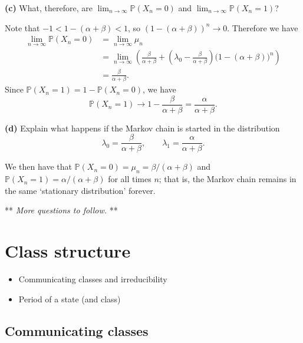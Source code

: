 \documentclass[
  a4paper,
]{article}
\providecommand{\tightlist}{%
  \setlength{\itemsep}{0pt}\setlength{\parskip}{0pt}}
\theoremstyle{definition}
\theoremstyle{definition}
\theoremstyle{definition}
\theoremstyle{remark}
\begin{document}
\textbf{(c)} What, therefore, are \(\lim_{n\to\infty} \mathbb P(X_n = 0)\) and \(\lim_{n\to\infty} \mathbb P(X_n = 1)\)?

\begin{myanswers}

Note that \(-1 < 1 - (\alpha + \beta) < 1\), so \((1-(\alpha+\beta))^n \to 0\). Therefore we have
\begin{align*}
\lim_{n\to\infty} \mathbb P(X_n = 0) &= \lim_{n\to\infty} \mu_n \\
&= \lim_{n\to\infty} \left( \frac{\beta}{\alpha+\beta} + \left(\lambda_0 - \frac{\beta}{\alpha+\beta}\right)\big(1-(\alpha+\beta)\big)^n \right) \\
&= \frac{\beta}{\alpha+\beta} .
\end{align*}
Since \(\mathbb P(X_n = 1) = 1- \mathbb P(X_n = 0)\), we have
\[ \mathbb P(X_n = 1) \to 1 - \frac{\beta}{\alpha+\beta} = \frac{\alpha}{\alpha+\beta} . \]

\end{myanswers}

\textbf{(d)} Explain what happens if the Markov chain is started in the distribution
\[ \lambda_0 = \frac{\beta}{\alpha+\beta} , \qquad \lambda_1 = \frac{\alpha}{\alpha+\beta}  . \]

\begin{myanswers}

We then have that \(\mathbb P(X_n = 0) = \mu_n = \beta/(\alpha+\beta)\) and \(\mathbb P(X_n = 1) = \alpha/(\alpha+\beta)\) for all times \(n\); that is, the Markov chain remains in the same `stationary distribution' forever.

\end{myanswers}

** \emph{More questions to follow.} **

\hypertarget{S07-classes}{%
\section{Class structure}\label{S07-classes}}

\begin{itemize}
\tightlist
\item
  Communicating classes and irreducibility
\item
  Period of a state (and class)
\end{itemize}

\hypertarget{comm-classes}{%
\subsection{Communicating classes}\label{comm-classes}}
\end{document}
